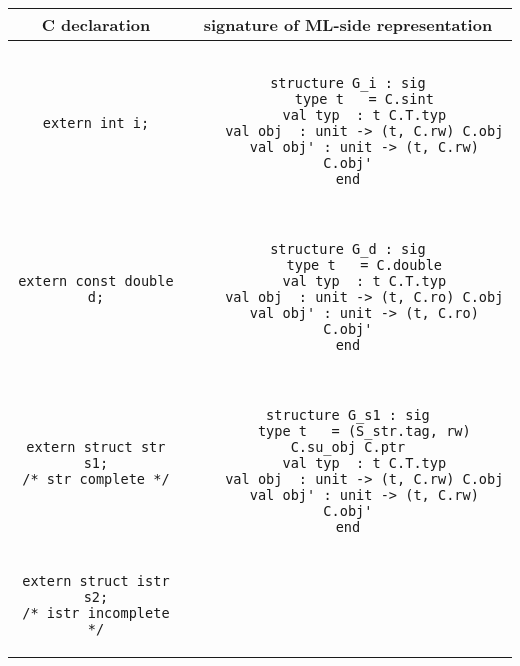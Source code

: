 \documentclass[titlepage,letterpaper]{article}
\begin{document}
\begin{small}
\begin{center}
\begin{tabular}{c|c}
C declaration & signature of ML-side representation \\ \hline\hline
\begin{minipage}{2in}
\begin{verbatim}
extern int i;
\end{verbatim}
\end{minipage}
&
\begin{minipage}{4in}
\begin{verbatim}

structure G_i : sig
    type t   = C.sint
    val typ  : t C.T.typ
    val obj  : unit -> (t, C.rw) C.obj
    val obj' : unit -> (t, C.rw) C.obj'
end

\end{verbatim}
\end{minipage}
\\ \hline
\begin{minipage}{2in}
\begin{verbatim}
extern const double d;
\end{verbatim}
\end{minipage}
&
\begin{minipage}{4in}
\begin{verbatim}

structure G_d : sig
    type t   = C.double
    val typ  : t C.T.typ
    val obj  : unit -> (t, C.ro) C.obj
    val obj' : unit -> (t, C.ro) C.obj'
end

\end{verbatim}
\end{minipage}
\\ \hline
\begin{minipage}{2in}
\begin{verbatim}
extern struct str s1;
/* str complete */
\end{verbatim}
\end{minipage}
&
\begin{minipage}{4in}
\begin{verbatim}

structure G_s1 : sig
    type t   = (S_str.tag, rw) C.su_obj C.ptr
    val typ  : t C.T.typ
    val obj  : unit -> (t, C.rw) C.obj
    val obj' : unit -> (t, C.rw) C.obj'
end

\end{verbatim}
\end{minipage}
\\ \hline
\begin{minipage}{2in}
\begin{verbatim}
extern struct istr s2;
/* istr incomplete */
\end{verbatim}
\end{minipage}
&
\begin{minipage}{4in}
\begin{verbatim}


\end{verbatim}
\end{minipage}
\end{tabular}
\end{center}
\end{small}
\end{document}
